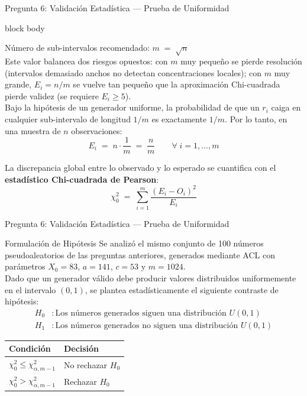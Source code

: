 \documentclass[aspectratio=169, 10pt]{beamer}
\newenvironment{emptyblock}
{
  \begin{beamercolorbox}[
      wd=\linewidth,
      sep=0.2cm,
      rounded=true
    ]{block body}
}
{
  \end{beamercolorbox}
}
\begin{document}
\begin{frame}{Pregunta 6: Validación Estadística — Prueba de Uniformidad}
	\begin{emptyblock}
		\justifying
		Número de sub-intervalos recomendado: $m \;=\; \sqrt{n}$\\[6pt]
		Este valor balancea dos riesgos opuestos: con $m$ muy pequeño se
		pierde resolución (intervalos demasiado anchos no detectan
		concentraciones locales); con $m$ muy grande, $E_i = n/m$ se vuelve
		tan pequeño que la aproximación Chi-cuadrada pierde validez
		(se requiere $E_i \geq 5$).\\[6pt]
		Bajo la hipótesis de un generador uniforme, la probabilidad de que
		un $r_i$ caiga en cualquier sub-intervalo de longitud $1/m$ es
		exactamente $1/m$. Por lo tanto, en una muestra de $n$ observaciones:
		\[
			E_i \;=\; n \cdot \frac{1}{m} \;=\; \frac{n}{m}
			\qquad \forall\; i = 1,\ldots,m
		\]

		La discrepancia global entre lo observado y lo esperado se cuantifica
		con el \textbf{estadístico Chi-cuadrada de Pearson}:
		\[
			\chi^2_0 \;=\; \sum_{i=1}^{m} \frac{(E_i - O_i)^2}{E_i}
		\]
	\end{emptyblock}
\end{frame}

\begin{frame}{Pregunta 6: Validación Estadística — Prueba de Uniformidad}
	\begin{exampleblock}{Formulación de Hipótesis}
		\justifying
		Se analizó el mismo conjunto de 100 números pseudoaleatorios de las preguntas anteriores,
		generados mediante ACL con parámetros $X_0 = 83$, $a = 141$, $c = 53$ y $m = 1024$.\\[6pt]
		Dado que un generador válido debe producir valores distribuidos
		uniformemente en el intervalo $(0,1)$, se plantea estadísticamente
		el siguiente contraste de hipótesis:
		\begin{align*}
			H_0 & : \text{Los números generados siguen una distribución } U(0,1)    \\[6pt]
			H_1 & : \text{Los números generados no siguen una distribución } U(0,1)
		\end{align*}
		\begin{center}
			\small
			\renewcommand{\arraystretch}{1.3}
			\setlength{\tabcolsep}{12pt}
			\begin{tabular}{ll}
				\toprule
				\textbf{Condición}                  & \textbf{Decisión} \\
				\midrule
				$\chi_0^2 \leq \chi^2_{\alpha,m-1}$ & No rechazar $H_0$ \\
				$\chi_0^2 > \chi^2_{\alpha,m-1}$    & Rechazar $H_0$    \\
				\bottomrule
			\end{tabular}
		\end{center}
	\end{exampleblock}
\end{frame}
\end{document}
